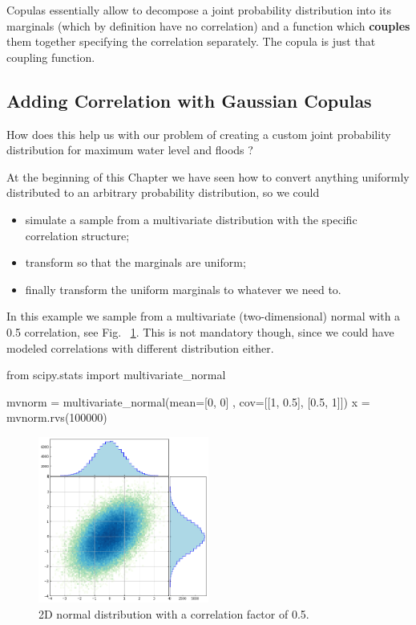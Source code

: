 Copulas essentially allow to decompose a joint probability distribution into its marginals (which by definition have no correlation) and a function which \textbf{couples} them together specifying the correlation separately. The copula is just that coupling function.

\subsection{Adding Correlation with Gaussian Copulas}
\label{adding-correlation-with-gaussian-copulas}

How does this help us with our problem of creating a custom joint probability distribution for maximum water level and floods ?

At the beginning of this Chapter we have seen how to convert anything uniformly distributed to an arbitrary probability distribution, so we could
\begin{itemize}
\tightlist
\item
  simulate a sample from a multivariate distribution with the specific correlation structure;
\item
  transform so that the marginals are uniform;
\item
  finally transform the uniform marginals to whatever we need to.
\end{itemize}

In this example we sample from a multivariate (two-dimensional) normal with a 0.5 correlation, 
see Fig.~ \ref{fig:multivariate_with_correlation}. This is not mandatory 
though, since
we could have modeled correlations with different distribution either.

\begin{ipython}
from scipy.stats import multivariate_normal

mvnorm = multivariate_normal(mean=[0, 0] , cov=[[1, 0.5], [0.5, 1]])
x = mvnorm.rvs(100000)
\end{ipython}

\begin{figure}[hb]
  \centering
  \includegraphics[width=0.5\textwidth]{figures/lesson6_14_0.png}
  \caption{2D normal distribution with a correlation factor of 0.5.}
  \label{fig:multivariate_with_correlation}
\end{figure}
    
